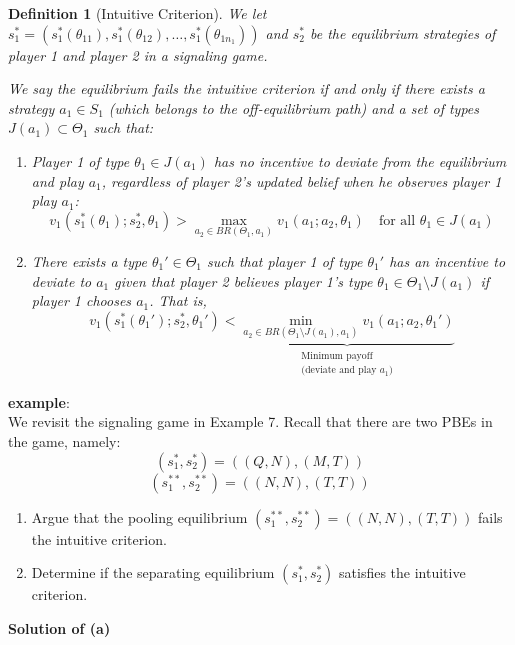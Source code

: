 \documentclass[twoside]{article}
\theoremstyle{definitionstyle}
\newtheorem*{definition}{Definition}
\begin{document}
\begin{definition}[Intuitive Criterion]
    We let $s_1^* = (s_1^*(\theta_{11}), s_1^*(\theta_{12}), \dots, s_1^*(\theta_{1n_1}))$ and $s_2^*$ be the equilibrium strategies of player 1 and player 2 in a signaling game.

We say the equilibrium fails the intuitive criterion if and only if there exists a strategy $a_1 \in S_1$ (which belongs to the off-equilibrium path) and a set of types $J(a_1) \subset \Theta_1$ such that:

\begin{enumerate}
    \item Player 1 of type $\theta_1 \in J(a_1)$ has no incentive to deviate from the equilibrium and play $a_1$, regardless of player 2’s updated belief when he observes player 1 play $a_1$:
    $$v_1(s_1^*(\theta_1); s_2^*, \theta_1) > \max_{a_2 \in BR(\Theta_1, a_1)} v_1(a_1; a_2, \theta_1) \quad \text{for all } \theta_1 \in J(a_1)$$
    
    \item There exists a type $\theta_1' \in \Theta_1$ such that player 1 of type $\theta_1'$ has an incentive to deviate to $a_1$ given that player 2 believes player 1’s type $\theta_1 \in \Theta_1 \setminus J(a_1)$ if player 1 chooses $a_1$. That is,
    $$v_1(s_1^*(\theta_1'); s_2^*, \theta_1') < \underbrace{\min_{a_2 \in BR(\Theta_1 \setminus J(a_1), a_1)} v_1(a_1; a_2, \theta_1')}_{\substack{\text{Minimum payoff} \\ \text{(deviate and play } a_1\text{)}}}$$
\end{enumerate}
\end{definition}

\textbf{example}: \\
We revisit the signaling game in Example 7. Recall that there are two PBEs in the game, namely:
$$(s_1^*, s_2^*) = ((Q, N), (M, T))$$
$$(s_1^{**}, s_2^{**}) = ((N, N), (T, T))$$

\begin{enumerate}
    \item[(a)] Argue that the pooling equilibrium $(s_1^{**}, s_2^{**}) = ((N, N), (T, T))$ fails the intuitive criterion.
    \item[(b)] Determine if the separating equilibrium $(s_1^*, s_2^*)$ satisfies the intuitive criterion.
\end{enumerate}

\vspace{1em}
\noindent\textbf{Solution of (a)}
\end{document}
